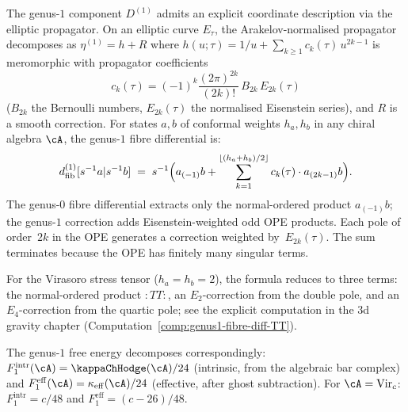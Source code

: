 \begin{remark}
\label{rem:eisenstein-weighted-genus1}
%
%
The genus-$1$ component $D^{(1)}$ admits an explicit coordinate
description via the elliptic propagator. On an elliptic curve
$E_\tau$, the Arakelov-normalised propagator decomposes as
$\eta^{(1)} = h + R$ where $h(u;\tau) = 1/u
+ \sum_{k \ge 1} c_k(\tau)\,u^{2k-1}$ is meromorphic with
propagator coefficients
\begin{equation}\label{eq:modular-propagator-coeffs}
c_k(\tau)
= (-1)^k \frac{(2\pi)^{2k}}{(2k)!}\,B_{2k}\,E_{2k}(\tau)
\end{equation}
($B_{2k}$ the Bernoulli numbers, $E_{2k}(\tau)$ the normalised
Eisenstein series), and $R$ is a smooth correction. For states
$a, b$ of conformal weights $h_a, h_b$ in any chiral algebra
$\cA$, the genus-$1$ fibre differential is:
\begin{equation}\label{eq:modular-dfib-genus1-general}
d_{\mathrm{fib}}^{(1)}[s^{-1}a | s^{-1}b]
\;=\;
s^{-1}\Bigl(
 a_{(-1)}b
 + \sum_{k=1}^{\lfloor (h_a+h_b)/2 \rfloor}
 c_k(\tau)\cdot a_{(2k-1)}b
\Bigr).
\end{equation}
The genus-$0$ fibre differential extracts only the normal-ordered
product $a_{(-1)}b$; the genus-$1$ correction adds
Eisenstein-weighted odd OPE products. Each pole of order~$2k$
in the OPE generates a correction weighted by~$E_{2k}(\tau)$.
The sum terminates because the OPE has finitely many singular
terms.

For the Virasoro stress tensor ($h_a = h_b = 2$), the formula
reduces to three terms: the normal-ordered product ${:}TT{:}$,
an $E_2$-correction from the double pole, and an
$E_4$-correction from the quartic pole; see the explicit
computation in the $3$d gravity chapter
(Computation~\ref{comp:genus1-fibre-diff-TT}).

The genus-$1$ free energy decomposes correspondingly:
$F_1^{\mathrm{intr}}(\cA) = \kappaChHodge(\cA)/24$
(intrinsic, from the algebraic bar complex) and
$F_1^{\mathrm{eff}}(\cA) = \kappa_{\mathrm{eff}}(\cA)/24$
(effective, after ghost subtraction). For
$\cA = \mathrm{Vir}_c$:
$F_1^{\mathrm{intr}} = c/48$ and
$F_1^{\mathrm{eff}} = (c-26)/48$.
\end{remark}

